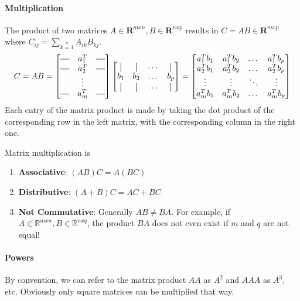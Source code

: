 \documentclass{article}
\newcommand*{\vertbar}{\rule[-1ex]{0.5pt}{2.5ex}} %
\newcommand*{\horzbar}{\rule[.5ex]{2.5ex}{0.5pt}}
\begin{document}
\paragraph{Multiplication} The product of two matrices $A\in \mathbf{R}^{mxn}, B\in \mathbf{R}^{nxp}$ results in $C = AB \in \mathbf{R}^{mxp}$ where $C_{ij} = \sum\limits_{k=1}\limits^{n}{A_{ik}B_{kj}}$.
\[C = AB = \begin{bmatrix}
     \horzbar & a_{1}^{T} & \horzbar \\
     \horzbar & a_{2}^{T} & \horzbar \\
     & \vdots &  \\
    \horzbar & a_{m}^{T} & \horzbar
\end{bmatrix}
\begin{bmatrix}
    \vertbar & \vertbar & \dots & \vertbar \\
    b_{1} & b_{2} &  \dots  & b_{p} \\
    \vertbar & \vertbar & \dots & \vertbar
\end{bmatrix}
= 
\begin{bmatrix}
    a_{1}^{T}b_{1} & a_{1}^{T}b_{2} & \dots  & a_{1}^{T}b_{p} \\
    a_{2}^{T}b_{1} & a_{2}^{T}b_{2} &  \dots  & a_{2}^{T}b_{p} \\
    \vdots & \vdots &  \ddots & \vdots \\
    a_{m}^{T}b_{1} & a_{m}^{T}b_{2} &  \dots  & a_{m}^{T}b_{p}
\end{bmatrix}\]
Each entry of the matrix product is made by taking the dot product of the corresponding row in the left matrix, with the corresponding column in the right one.

Matrix multiplication is
\begin{enumerate}
  \item \textbf{Associative}: $(AB)C = A(BC)$
  \item \textbf{Distributive}: $(A+B)C = AC + BC$
  \item \textbf{Not Commutative}: Generally $AB \neq BA$. For example, if $A\in \mathbb{R}^{mxn}, B \in \mathbb{R}^{nxq}$, the product $BA$ does not even exist if $m$ and $q$ are not equal!
\end{enumerate} 

\paragraph{Powers} By convention, we can refer to the matrix product $AA$ as $A^2$ and $AAA$ as $A^3$, etc. Obviously only square matrices can be multiplied that way.
\end{document}
